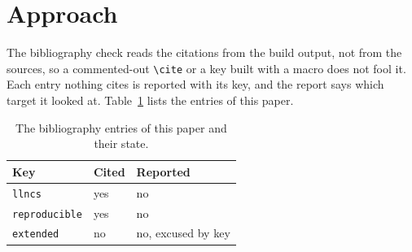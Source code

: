 \section{Approach}

The bibliography check reads the citations from the build output, not from
the sources, so a commented-out \verb|\cite| or a key built with a macro does
not fool it. Each entry nothing cites is reported with its key, and the
report says which target it looked at. Table~\ref{tab:entries} lists the
entries of this paper.

\begin{table}[t]
  \caption{The bibliography entries of this paper and their state.}
  \label{tab:entries}
  \centering
  \begin{tabular}{lll}
    \toprule
    Key & Cited & Reported \\
    \midrule
    \texttt{llncs} & yes & no \\
    \texttt{reproducible} & yes & no \\
    \texttt{extended} & no & no, excused by key \\
    \bottomrule
  \end{tabular}
\end{table}
